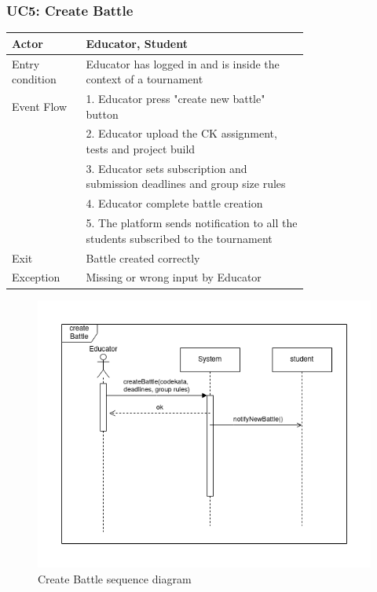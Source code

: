 \subsubsection{UC5: Create Battle}
\begin{center}
    \begin{longtable}{lp{0.75\linewidth}}
        \hline
            Actor & Educator, Student\\
        \hline
            Entry condition & Educator has logged in and is inside the context of a tournament\\
        \hline
            Event Flow & 1. Educator press "create new battle" button\\
                       & 2. Educator upload the \ac{CK} assignment, tests and project build\\
                       & 3. Educator sets subscription and submission deadlines and group size rules\\
                       & 4. Educator complete battle creation\\
                       & 5. The platform sends notification to all the students subscribed to the tournament\\
        \hline
            Exit & Battle created correctly\\
        \hline
            Exception & Missing or wrong input by Educator\\
        \hline
    \end{longtable}
\end{center}

\begin{figure}[H]
    \centering
    \includegraphics[width=1\linewidth]{misc//Images//UC Diagrams/UC5.png}
    \caption{Create Battle sequence diagram}
    \label{fig:enter-label}
\end{figure}

